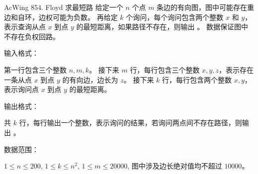 \begin{titledbox}{AcWing 854. Floyd 求最短路}
    给定一个 $n$ 个点 $m$ 条边的有向图，图中可能存在重边和自环，边权可能为负数。 再给定 $k$ 个询问，每个询问包含两个整数 $x$ 和 $y$，表示查询从点 $x$ 到点 $y$ 的最短距离，如果路径不存在，则输出 。 数据保证图中不存在负权回路。

    输入格式：

    第一行包含三个整数 $n,m,k$。 接下来 $m$ 行，每行包含三个整数 $x,y,z$，表示存在一条从点 $x$ 到点 $y$ 的有向边，边长为 $z$。 接下来 $k$ 行，每行包含两个整数 $x,y$，表示询问点 $x$ 到点 $y$ 的最短距离。

    输出格式：

    共 $k$ 行，每行输出一个整数，表示询问的结果，若询问两点间不存在路径，则输出 。

    数据范围：

    $1 \le n \le 200$, $1 \le k \le n^2$, $1 \le m \le 20000$, 图中涉及边长绝对值均不超过 $10000$。

    \begin{inputblock}
         \\
         \\
         \\
         \\
         \\
    \end{inputblock}
    \begin{outputblock}
         \\
    \end{outputblock}
\end{titledbox}

